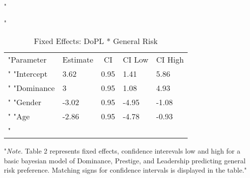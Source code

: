 \documentclass[
"  donotrepeattitle,doc, 12pt, a4paper,floatsintext]{apa7}"
\begin{document}
\begin{table}[h]
\begin{center}
\begin{threeparttable}
"\caption{\label{tab:unnamed-chunk-3}Fixed Effects: DoPL * General Risk}"
\begin{tabular}{lllll}
\toprule
"Parameter & \multicolumn{1}{c}{Estimate} & \multicolumn{1}{c}{CI} & \multicolumn{1}{c}{CI Low} & \multicolumn{1}{c}{CI High}\\"
\midrule
"Intercept & 3.62 & 0.95 & 1.41 & 5.86\\"
"Dominance & 3 & 0.95 & 1.08 & 4.93\\"
"Gender & -3.02 & 0.95 & -4.95 & -1.08\\"
"Age & -2.86 & 0.95 & -4.78 & -0.93\\"
\bottomrule
\addlinespace
\end{tabular}
\begin{tablenotes}[para]
"\normalsize{\textit{Note.} Table 2 represents fixed effects, confidence interevals low and high for a basic bayesian model of Dominance, Prestige, and Leadership predicting general risk preference. Matching signs for confidence intervals is displayed in the table.}"
\end{tablenotes}
\end{threeparttable}
\end{center}
\end{table}
\end{document}
